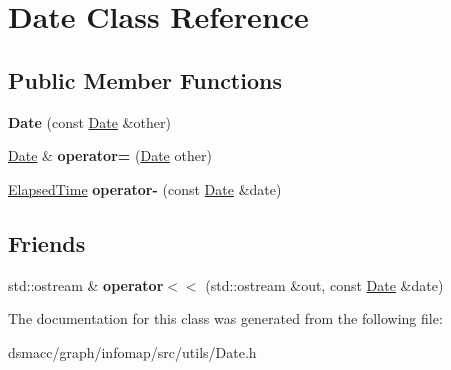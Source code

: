 \hypertarget{classDate}{}\section{Date Class Reference}
\label{classDate}
\subsection*{Public Member Functions}
\begin{DoxyCompactItemize}
\item 
\mbox{\label{classDate_a521cf49a1242108fb010f77e2a2458fe}} 
{\bfseries Date} (const \mbox{\hyperlink{classDate}{Date}} \&other)
\item 
\mbox{\label{classDate_ad1e2de727312e222d71c3a25a5d91d81}} 
\mbox{\hyperlink{classDate}{Date}} \& {\bfseries operator=} (\mbox{\hyperlink{classDate}{Date}} other)
\item 
\mbox{\label{classDate_a0cd1bb42e6400f71abe4642457598d17}} 
\mbox{\hyperlink{classElapsedTime}{Elapsed\+Time}} {\bfseries operator-\/} (const \mbox{\hyperlink{classDate}{Date}} \&date)
\end{DoxyCompactItemize}
\subsection*{Friends}
\begin{DoxyCompactItemize}
\item 
\mbox{\label{classDate_a979c6b0ce07a9560a2129b81363b84f9}} 
std\+::ostream \& {\bfseries operator$<$$<$} (std\+::ostream \&out, const \mbox{\hyperlink{classDate}{Date}} \&date)
\end{DoxyCompactItemize}


The documentation for this class was generated from the following file\+:\begin{DoxyCompactItemize}
\item 
dsmacc/graph/infomap/src/utils/Date.\+h\end{DoxyCompactItemize}
